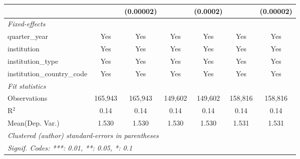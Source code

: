 \begin{tabular}{lcccccc}
                                      &               & (0.00002)     &               & (0.0002)      &               & (0.00002)\\   
   \midrule
   \emph{Fixed-effects}\\
   quarter\_year                      & Yes           & Yes           & Yes           & Yes           & Yes           & Yes\\  
   institution                        & Yes           & Yes           & Yes           & Yes           & Yes           & Yes\\  
   institution\_type                  & Yes           & Yes           & Yes           & Yes           & Yes           & Yes\\  
   institution\_country\_code         & Yes           & Yes           & Yes           & Yes           & Yes           & Yes\\  
   \midrule
   \emph{Fit statistics}\\
   Observations                       & 165,943       & 165,943       & 149,602       & 149,602       & 158,816       & 158,816\\  
   R$^2$                              & 0.14          & 0.14          & 0.14          & 0.14          & 0.14          & 0.14\\  
Mean(Dep. Var.) & 1.530 & 1.530 & 1.530 & 1.530 & 1.531 & 1.531 \\
   \midrule \midrule
   \multicolumn{7}{l}{\emph{Clustered (author) standard-errors in parentheses}}\\
   \multicolumn{7}{l}{\emph{Signif. Codes: ***: 0.01, **: 0.05, *: 0.1}}\\
\end{tabular}
\par\endgroup
